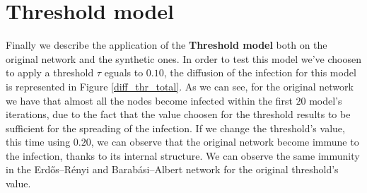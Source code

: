 
\section{Threshold model} %
\label{sec:threshold_model}
    Finally we describe the application of the \textbf{Threshold model} both on the original network and the
    synthetic ones. In order to test this model we've choosen to apply a threshold $\tau$ eguals to $0.10$, the
    diffusion of the infection for this model is represented in Figure \ref{diff_thr_total}. As we can see, for the
    original network we have that almost all the nodes become infected within the first $20$ model's iterations,
    due to the fact that the value choosen for the threshold results to be sufficient for the spreading of the
    infection. If we change the threshold's value, this time using $0.20$, we can observe that the
    original network become immune to the infection, thanks to its internal structure. We can observe
    the same immunity in the Erdős–Rényi and Barabási–Albert network for the original threshold's value.
